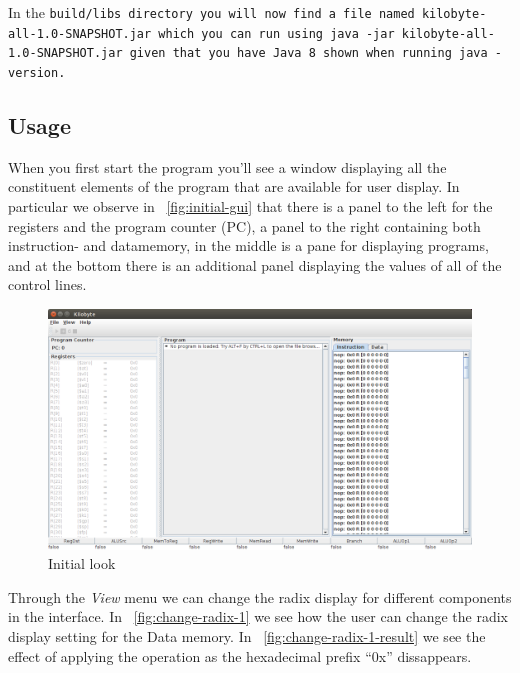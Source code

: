 In the \tt{build/libs} directory you will now find a file named
\tt{kilobyte-all-1.0-SNAPSHOT.jar} which you can run using \tt{java -jar
  kilobyte-all-1.0-SNAPSHOT.jar} given that you have Java 8 shown when running
\tt{java -version}.

\subsection{Usage}

When you first start the program you'll see a window displaying all
the constituent elements of the program that are available for user
display. In particular we observe in ~\autoref{fig:initial-gui} that
there is a panel to the left for the registers and the program counter
(PC), a panel to the right containing both instruction- and
datamemory, in the middle is a pane for displaying programs, and at
the bottom there is an additional panel displaying the values of all
of the control lines.

\begin{figure}[H]
  \centering
  \includegraphics[width=\textwidth]{images/initial_gui.png} 
  \caption{Initial look} 
  \label{fig:initial-gui}
\end{figure}

Through the \emph{View} menu we can change the radix display for
different components in the interface. In
~\autoref{fig:change-radix-1} we see how the user can change the radix
display setting for the Data memory. In
~\autoref{fig:change-radix-1-result} we see the effect of applying the
operation as the hexadecimal prefix ``0x'' dissappears.

